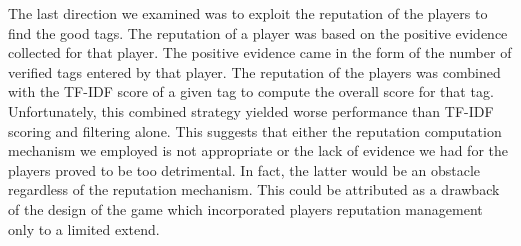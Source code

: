 The last direction we examined was to exploit the reputation of the players to find the good tags. The reputation of a player was based on the positive evidence collected for that player. The positive evidence came in the form of the number of verified tags entered by that player. The reputation of the players was combined with the TF-IDF score of a given tag to compute the overall score for that tag. Unfortunately, this combined strategy yielded worse performance than TF-IDF scoring and filtering alone. This suggests that either the reputation computation mechanism we employed is not appropriate or the lack of evidence we had for the players proved to be too detrimental. In fact, the latter would be an obstacle regardless of the reputation mechanism. This could be attributed as a drawback of the design of the game which incorporated players reputation management only to a limited extend.